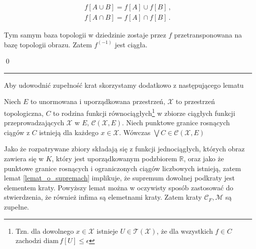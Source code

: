 \begin{gather*}
	f[A \cup B] = f[A] \cup f[B]\,, \\
	f[A \cap B] = f[A] \cap f[B]\,. 
\end{gather*}	

Tym samym baza topologii w dziedzinie zostaje przez $ f $ przetransponowana na bazę topologii obrazu. Zatem $ f^{(-1)} $ jest ciągła.
	
\qed
\newline


\hrule
\begin{dowod}[Zbiór funkcji $W \in \{\mathcal{C}_F,\mathcal{M}  \} $ to krata zupełna względem relacji porządku zadanego następująco: dla $ f,g \in W$ to
 $ f \geq g \leftrightarrow \underset{x \in K}{\forall} f(x) \geq g(x) $. 
Wówczas też $ 1_{\mathcal{C}_F} = F $, $ 0_{\mathcal{C}_F} = 0 $, $ 1_{\mathcal{M}} = H^{-1}\circ F $ oraz $ 0_{\mathcal{M}} = 0 $. Nadto, operator $ A:\mathcal{C}_F \rightarrow \mathcal{C}_F $ to operator monotoniczny na $ \mathcal{C}_F $, a operator $ B:\mathcal{M} \rightarrow \mathcal{M} $ to operator monotoniczny na $ \mathcal{M} $.  
]\label{proof_lattices}
\end{dowod}

Aby udowodnić zupełność krat skorzystamy dodatkowo z następującego lematu \citep[][rozdział 9.2.4, twr. 9.40, str. 429]{Carl} 

\begin{lemat}\label{lemat_o_supremach}
	Niech $ E $ to unormowana i uporządkowana przestrzeń, $ \mathcal{X} $ to przestrzeń topologiczna, $ C $ to rodzina funkcji równociągłych\footnote{Tzn. dla dowolnego $ x \in \mathcal{X} $ istnieje $ U \in \mathcal{T}(\mathcal{X}) $, że dla wszystkich $ f \in C $ zachodzi $ \mathrm{diam}\,f[U] \leq \epsilon $} w zbiorze ciągłych funkcji przeprowadzających $ \mathcal{X} $ w $ E $, $\mathcal{C}(\mathcal{X},E)$. Niech punktowe granice rosnących ciągów z $ C $ istnieją dla każdego $ x \in \mathcal{X} $. Wówczas $ \bigvee C  \in \mathcal{C}(\mathcal{X},E)$    
\end{lemat}

	Jako że rozpatrywane zbiory składają się z funkcji jednociągłych, których obraz zawiera się w $ K $, który jest uporządkowanym podzbiorem $ \mathbb{R} $, oraz jako że punktowe granice rosnących i ograniczonych ciągów liczbowych istnieją, zatem lemat \ref{lemat_o_supremach} implikuje, że supremum dowolnej podkraty jest elementem kraty. Powyższy lemat można w oczywisty sposób zastosować do stwierdzenia, że również infima są elemetnami kraty. Zatem kraty  $ \mathcal{C}_F,\mathcal{M}   $ są zupełne.
	
